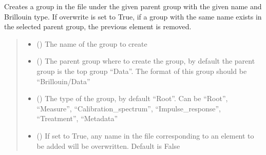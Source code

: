\documentclass[letterpaper,10pt,english]{sphinxmanual}
\begin{document}
\begin{fulllineitems}
\begin{fulllineitems}
\label{\detokenize{source/HDF5_BLS:HDF5_BLS.wrapper.Wrapper.create_group}}
\pysigstartsignatures
\pysiglinewithargsret
{}
{\sphinxparamcomma {}\sphinxparamcomma {}\sphinxparamcomma {}}
{}
\pysigstopsignatures
\sphinxAtStartPar
Creates a group in the file under the given parent group with the given name and Brillouin type. If overwrite is set to True, if a group with the same name exists in the selected parent group, the previous element is removed.
\begin{quote}\begin{description}
\begin{itemize}
\item {} 
\sphinxAtStartPar
{} () \textendash{} The name of the group to create

\item {} 
\sphinxAtStartPar
{} (\sphinxstyleliteralemphasis{\sphinxupquote{, }}) \textendash{} The parent group where to create the group, by default the parent group is the top group “Data”. The format of this group should be “Brillouin/Data”

\item {} 
\sphinxAtStartPar
{} (\sphinxstyleliteralemphasis{\sphinxupquote{, }}) \textendash{} The type of the group, by default “Root”. Can be “Root”, “Measure”, “Calibration\_spectrum”, “Impulse\_response”, “Treatment”, “Metadata”

\item {} 
\sphinxAtStartPar
{} (\sphinxstyleliteralemphasis{\sphinxupquote{, }}) \textendash{} If set to True, any name in the file corresponding to an element to be added will be overwritten. Default is False


\end{itemize}
\end{description}
\end{quote}
\end{fulllineitems}
\end{fulllineitems}
\end{document}
